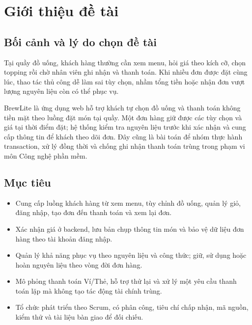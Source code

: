 \chapter{Giới thiệu đề tài}
\label{chap:gioi-thieu}

\section{Bối cảnh và lý do chọn đề tài}
Tại quầy đồ uống, khách hàng thường cần xem menu, hỏi giá theo kích cỡ,
chọn topping rồi chờ nhân viên ghi nhận và thanh toán. Khi nhiều đơn được
đặt cùng lúc, thao tác thủ công dễ làm sai tùy chọn, nhầm tổng tiền hoặc
nhận đơn vượt lượng nguyên liệu còn có thể phục vụ.

BrewLite là ứng dụng web hỗ trợ khách tự chọn đồ uống và thanh toán
không tiền mặt theo luồng đặt món tại quầy. Một đơn hàng giữ được các tùy
chọn và giá tại thời điểm đặt; hệ thống kiểm tra nguyên liệu trước khi
xác nhận và cung cấp thông tin để khách theo dõi đơn. Đây cũng là bài toán
để nhóm thực hành transaction, xử lý đồng thời và chống ghi nhận thanh
toán trùng trong phạm vi môn Công nghệ phần mềm.

\section{Mục tiêu}
\begin{itemize}
    \item Cung cấp luồng khách hàng từ xem menu, tùy chỉnh đồ uống,
    quản lý giỏ, đăng nhập, tạo đơn đến thanh toán và xem lại đơn.
    \item Xác nhận giá ở backend, lưu bản chụp thông tin món và bảo vệ
    dữ liệu đơn hàng theo tài khoản đăng nhập.
    \item Quản lý khả năng phục vụ theo nguyên liệu và công thức;
    giữ, sử dụng hoặc hoàn nguyên liệu theo vòng đời đơn hàng.
    \item Mô phỏng thanh toán Ví/Thẻ, hỗ trợ thử lại và xử lý một yêu cầu
    thanh toán lặp mà không tạo tác động tài chính trùng.
    \item Tổ chức phát triển theo Scrum, có phân công, tiêu chí chấp nhận,
    mã nguồn, kiểm thử và tài liệu bàn giao để đối chiếu.
\end{itemize}

